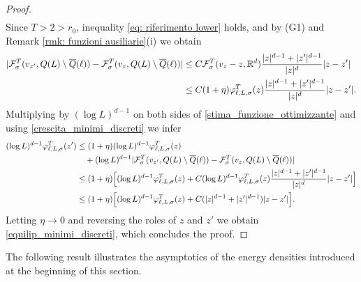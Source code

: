 \documentclass{article}
\theoremstyle{plain}
\theoremstyle{definition}
\def\rr{{\mathbb R}}
\newcommand{\f}{\varphi}
\newcommand{\s}{\sigma}
\numberwithin{equation}{section}
\begin{document}
\begin{proof}
\begin{align*}
   \end{align*}
Since $T>2>r_0$, inequality \eqref{eq: riferimento lower} holds, and by (G1) and Remark \ref{rmk: funzioni ausiliarie}(i) we obtain
        \begin{align*}\notag
        |\mathcal{F}^T_{\s}(v_{z'},Q(L)\setminus \overline{Q}(\ell))-\mathcal{F}^T_{\s}(v_{z},Q(L)\setminus \overline{Q}(\ell))|      
       & \leq C\mathcal{F}^{T}_{\s}(v_{z}-z,\rr^d)\frac{|z|^{d-1}+|z'|^{d-1}}{|z|^{d}}|z-z'| \\ 
       & \leq C(1+\eta)\f^{T}_{\ell,L,\s}(z) \frac{|z|^{d-1}+|z'|^{d-1}}{|z|^{d}}|z-z'|.
        \end{align*}
Multiplying by $(\log L)^{d-1}$ on both sides of \eqref{stima_funzione_ottimizzante} and using \eqref{crescita_minimi_discreti} we infer
   \begin{align*}
       (\log L)^{d-1}\f^T_{\ell,L,\s}(z') &\leq (1+\eta)(\log L)^{d-1}\f^T_{\ell,L,\s}(z)\\
       & \quad +(\log L)^{d-1}|\mathcal{F}^T_{\s}(v_{z'},Q(L)\setminus \overline{Q}(\ell))-\mathcal{F}^T_{\s}(v_{z},Q(L)\setminus \overline{Q}(\ell))|\\
       & \leq (1+\eta)\Bigl[(\log L)^{d-1}\f^T_{\ell,L,\s}(z)+C(\log L)^{d-1}\f^{T}_{\ell,L,\s}(z) \frac{|z|^{d-1}+|z'|^{d-1}}{|z|^{d}}|z-z'|\Bigr] \\
       & \leq (1+\eta)\Bigl[(\log L)^{d-1}\f^T_{\ell,L,\s}(z)+C(|z|^{d-1}+|z'|^{d-1})|z-z'|\Bigr].
   \end{align*}
Letting $\eta\to0$ and reversing the roles of $z$ and $z'$ we obtain \eqref{equilip_minimi_discreti}, which concludes the proof.
\end{proof}

The following result illustrates the asymptotics of the energy densities introduced at the beginning of this section.
\end{document}
